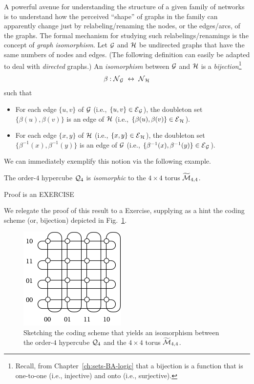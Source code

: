 A powerful avenue for understanding the structure of a given family of
networks is to understand how the perceived ``shape'' of graphs in the
family can apparently change just by relabeling/renaming the nodes, or
the edges/arcs, of the graphs.  The formal mechanism for studying such
relabelings/renamings is the concept of {\it graph isomorphism}.
 Let $\mbox{$\cal G$}$ and $\mbox{$\cal H$}$ be undirected graphs that
have the same numbers of nodes and edges.  (The following definition
can easily be adapted to deal with {\em directed} graphs.)  An {\it
  isomorphism} between $\mbox{$\cal G$}$ and $\mbox{$\cal H$}$ is a {\em
  bijection}\footnote{Recall, from Chapter~\ref{ch:sets-BA-logic} that
  a bijection is a function that is one-to-one (i.e., injective) and
  onto (i.e., surjective).}
\[ \beta: \mbox{$\cal N$}_{\mbox{{\scriptsize $\cal G$}}} \ \leftrightarrow \ \mbox{$\cal N$}_{\mbox{{\scriptsize $\cal H$}}} \]
such that
\begin{itemize}
\item
For each edge $\{ u,v \}$ of $\mbox{$\cal G$}$ (i.e., $\{ u,v \} \in \mbox{$\cal E$}_{\mbox{{\scriptsize $\cal G$}}}$),
the doubleton set $\{ \beta(u), \beta(v) \}$ is an edge of $\mbox{$\cal H$}$ (i.e.,
$\{ \beta(u), \beta(v) \} \in \mbox{$\cal E$}_{\mbox{{\scriptsize $\cal H$}}}$).
\item
For each edge $\{ x,y \}$ of $\mbox{$\cal H$}$ (i.e., $\{ x,y \} \in \mbox{$\cal E$}_{\mbox{{\scriptsize $\cal H$}}}$),
the doubleton set $\{ \beta^{-1}(x), \beta^{-1}(y) \}$ is an edge of $\mbox{$\cal G$}$ (i.e.,
$\{ \beta^{-1}(x), \beta^{-1}(y) \} \in \mbox{$\cal E$}_{\mbox{{\scriptsize $\cal G$}}}$).
\end{itemize}
We can immediately exemplify this notion via the following example.

\begin{prop}
The order-$4$ hypercube $\mbox{$\cal Q$}_4$ is \textit{isomorphic} to the $4 \times
4$ torus $\widetilde{\mbox{$\cal M$}}_{4,4}$.
\end{prop}

{\Arny Proof is an EXERCISE}

We relegate the proof of this result to a Exercise, supplying as a
hint the coding scheme (or, bijection) depicted in
Fig.~\ref{fig:toruslabel}.
\begin{figure}[hbt]
\begin{center}
       \includegraphics[scale=0.6]{FiguresGraph/toruslabel}
\caption{Sketching the coding scheme that yields an isomorphism
  between the order-$4$ hypercube $\mbox{$\cal Q$}_4$ and the $4 \times                          
4$ torus $\widetilde{\mbox{$\cal M$}}_{4,4}$.}
  \label{fig:toruslabel}
\end{center}
\end{figure}


